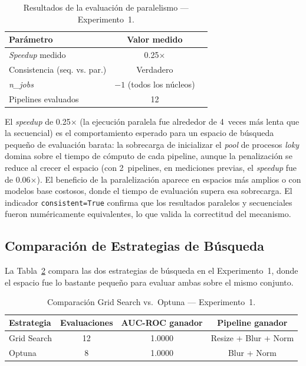 \documentclass[conference,spanish]{IEEEtran}
\begin{document}
\begin{table}[t]
\centering
\renewcommand{\arraystretch}{1.2}
\caption{Resultados de la evaluación de paralelismo — Experimento~1.}
\label{tab:speedup}
\begin{tabular}{@{}lcc@{}}
\toprule
\textbf{Parámetro} & \textbf{Valor medido} \\
\midrule
\textit{Speedup} medido              & 0.25$\times$ \\
Consistencia (seq. vs. par.)         & Verdadero \\
\textit{n\_jobs}                     & $-1$ (todos los núcleos) \\
Pipelines evaluados                  & 12 \\
\bottomrule
\end{tabular}
\end{table}

El \textit{speedup} de 0.25$\times$ (la ejecución paralela fue alrededor
de 4~veces más lenta que la secuencial) es el comportamiento esperado
para un espacio de búsqueda pequeño de evaluación barata: la sobrecarga
de inicializar el \textit{pool} de procesos \textit{loky} domina sobre el
tiempo de cómputo de cada pipeline, aunque la penalización se reduce al
crecer el espacio (con 2~pipelines, en mediciones previas, el
\textit{speedup} fue de 0.06$\times$). El beneficio de la paralelización
aparece en espacios más amplios o con modelos base costosos, donde el
tiempo de evaluación supera esa sobrecarga. El indicador
\texttt{consistent=True} confirma que los resultados paralelos y
secuenciales fueron numéricamente equivalentes, lo que valida la
correctitud del mecanismo.

\subsection{Comparación de Estrategias de Búsqueda}

La Tabla~\ref{tab:comparacion} compara las dos estrategias de búsqueda en
el Experimento~1, donde el espacio fue lo bastante pequeño para evaluar
ambas sobre el mismo conjunto.

\begin{table}[t]
\centering
\renewcommand{\arraystretch}{1.2}
\caption{Comparación Grid Search vs.\ Optuna — Experimento~1.}
\label{tab:comparacion}
\begin{tabular}{@{}lccc@{}}
\toprule
\textbf{Estrategia} & \textbf{Evaluaciones} & \textbf{AUC-ROC ganador} & \textbf{Pipeline ganador} \\
\midrule
Grid Search & 12 & 1.0000 & Resize + Blur + Norm \\
Optuna      & 8  & 1.0000 & Blur + Norm \\
\bottomrule
\end{tabular}
\end{table}
\end{document}
